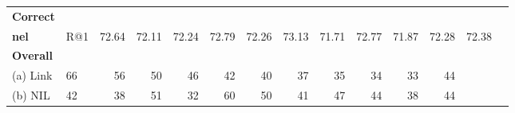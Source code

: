 \begin{table}
\begin{tabular}{llrrrrrrrrrrrr}
\textbf{Correct} &&&&&&&&&&&& \\
\textbf{\ac{nel}} & R@1          &   72.64 &  72.11 &   72.24 &   72.79 &  72.26 &  73.13 &   71.71 &   72.77 &  71.87 &   72.28 &  72.38 & \\
\hline
\textbf{Overall} \\
(a) Link & 66 & 56 & 50 & 46 & 42 & 40 & 37 & 35 & 34 & 33 & 44 & \\ 
(b) NIL & 42 & 38 & 51 & 32 & 60 & 50 & 41 & 47 & 44 & 38 & 44 & \\ 

\end{tabular}
\end{table}

